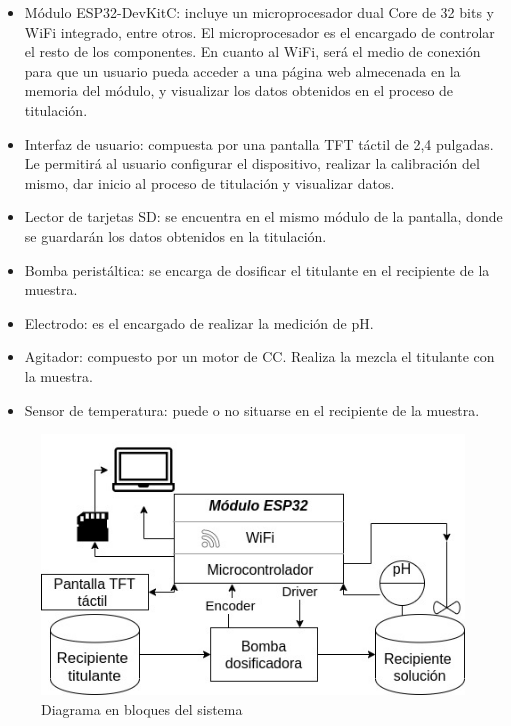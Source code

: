 \documentclass[11pt]{charter}
\begin{document}
\begin{itemize}
\item Módulo ESP32-DevKitC: incluye un microprocesador dual Core de 32 bits y WiFi integrado, entre otros. El microprocesador es el encargado de controlar el resto de los componentes. En cuanto al WiFi, será el medio de conexión para que un usuario pueda acceder a una página web almecenada en la memoria del módulo, y visualizar los datos obtenidos en el proceso de titulación.
\item Interfaz de usuario: compuesta por una pantalla TFT táctil de 2,4 pulgadas. Le permitirá al usuario configurar el dispositivo, realizar la calibración del mismo, dar inicio al proceso de titulación y visualizar datos.
\item Lector de tarjetas SD: se encuentra en el mismo módulo de la pantalla, donde se guardarán los datos obtenidos en la titulación.
\item Bomba peristáltica: se encarga de dosificar el titulante en el recipiente de la muestra.
\item Electrodo: es el encargado de realizar la medición de pH.
\item Agitador: compuesto por un motor de CC. Realiza la mezcla el titulante con la muestra.
\item Sensor de temperatura: puede o no situarse en el recipiente de la muestra.
\end{itemize}

\begin{figure}[htpb]
\centering 
\includegraphics[width=.9\textwidth]{./Figuras/diagBloques.jpg}
\caption{Diagrama en bloques del sistema}
\label{fig:diagBloques}
\end{figure}

\vspace{25px}
\end{document}
